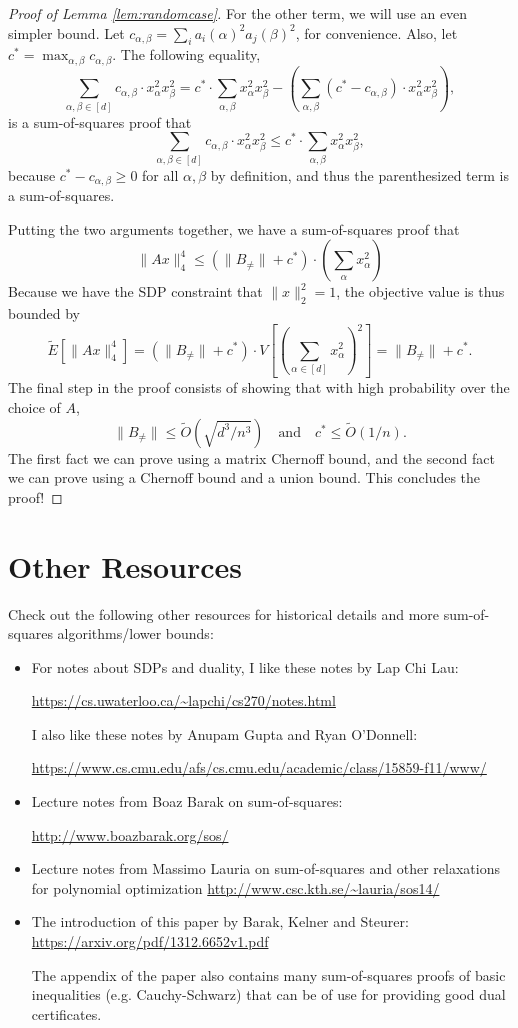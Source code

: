 \documentclass[a4paper,11pt]{article}
\theoremstyle{definition}
\begin{document}
\begin{proof}[Proof of Lemma \ref{lem:randomcase}]
For the other term, we will use an even simpler bound.
Let $c_{\alpha,\beta} = \sum_{i} a_i(\alpha)^2 a_j(\beta)^2$, for convenience.
Also, let $c^* = \max_{\alpha,\beta} c_{\alpha,\beta}$.
The following equality,
\[
\sum_{\alpha,\beta\in[d]}c_{\alpha,\beta}\cdot  x_{\alpha}^2 x_{\beta}^2
= c^*\cdot \sum_{\alpha, \beta} x_{\alpha}^2 x_{\beta}^2 -
\left(\sum_{\alpha,\beta} (c^* - c_{\alpha,\beta}) \cdot x_{\alpha}^2 x_{\beta}^2\right),
\]
is a sum-of-squares proof that
\[
\sum_{\alpha,\beta\in[d]}c_{\alpha,\beta}\cdot  x_{\alpha}^2 x_{\beta}^2
\le c^*\cdot \sum_{\alpha, \beta} x_{\alpha}^2 x_{\beta}^2,
\]
because $c^* - c_{\alpha,\beta} \ge 0$ for all $\alpha,\beta$ by definition, and thus the parenthesized term is a sum-of-squares.

Putting the two arguments together, we have a sum-of-squares proof that
\[
\|Ax\|_4^4 \le \left(\|B_{\neq}\| + c^*\right)\cdot \left(\sum_{\alpha} x_{\alpha}^2\right)
\]
Because we have the SDP constraint that $\|x\|_2^2 = 1$, the objective value is thus bounded by
\[
\tilde{E}[\|Ax\|_4^4] = (\|B_{\neq} \|+ c^*) \cdot V\left[\left(\sum_{\alpha\in [d]}x_{\alpha}^2\right)^2\right] = \|B_{\neq}\| + c^*.
\]
The final step in the proof consists of showing that with high probability over the choice of $A$,
\[
\|B_{\neq}\| \le \tilde{O}(\sqrt{d^3/n^3})\quad \text{and}\quad c^* \le \tilde{O}(1/n).
\]
The first fact we can prove using a matrix Chernoff bound, and the second fact we can prove using a Chernoff bound and a union bound.
This concludes the proof!
\end{proof}

\section{Other Resources}
Check out the following other resources for historical details and more sum-of-squares algorithms/lower bounds:
\begin{itemize}
\item For notes about SDPs and duality, I like these notes by Lap Chi Lau:

\url{https://cs.uwaterloo.ca/~lapchi/cs270/notes.html}

I also like these notes by Anupam Gupta and Ryan O'Donnell:

\url{https://www.cs.cmu.edu/afs/cs.cmu.edu/academic/class/15859-f11/www/}
\item Lecture notes from Boaz Barak on sum-of-squares:

\url{http://www.boazbarak.org/sos/}

\item Lecture notes from Massimo Lauria on sum-of-squares and other relaxations for polynomial optimization
\url{http://www.csc.kth.se/~lauria/sos14/}
\item The introduction of this paper by Barak, Kelner and Steurer:
\url{https://arxiv.org/pdf/1312.6652v1.pdf}

The appendix of the paper also contains many sum-of-squares proofs of basic inequalities (e.g. Cauchy-Schwarz) that can be of use for providing good dual certificates.
\end{itemize}
\end{document}
